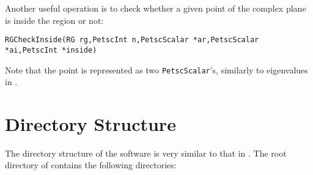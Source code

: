 Another useful operation is to check whether a given point of the complex plane is inside the region or not:
	\begin{Verbatim}[fontsize=\small]
        RGCheckInside(RG rg,PetscInt n,PetscScalar *ar,PetscScalar *ai,PetscInt *inside)
	\end{Verbatim}
Note that the point is represented as two \texttt{PetscScalar}'s, similarly to eigenvalues in \slepc.

\section{Directory Structure}

	The directory structure of the \slepc software is very similar to that in \petsc. The root directory of \slepc contains the following directories:
